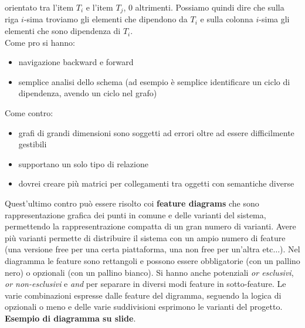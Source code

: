 \documentclass[a4paper,12pt, oneside]{book}
\begin{document}
orientato tra l'item $T_i$ e l'item $T_j$, 0 altrimenti. Possiamo quindi dire
che sulla riga $i$-sima troviamo gli elementi che dipendono da $T_i$ e sulla
colonna $i$-sima gli elementi che sono dipendenza di $T_i$.\\
Come pro si hanno:
\begin{itemize}
  \item navigazione backward e forward
  \item semplice analisi dello schema (ad esempio è semplice identificare un
  ciclo di dipendenza, avendo un ciclo nel grafo)
\end{itemize}
Come contro:
\begin{itemize}
  \item grafi di grandi dimensioni sono soggetti ad errori oltre ad essere
  difficilmente gestibili
  \item supportano un solo tipo di relazione
  \item dovrei creare più matrici per collegamenti tra oggetti con semantiche
  diverse 
\end{itemize}
Quest'ultimo contro può essere risolto coi \textbf{feature diagrams} che sono
rappresentazione grafica dei punti in comune e delle varianti del sistema,
permettendo la rappresentrazione compatta di un gran numero di varianti. Avere
più varianti permette di distribuire il sistema con un ampio numero di feature
(una versione free per una certa piattaforma, una non free per un'altra
etc$\ldots$). Nel diagramma le feature sono rettangoli e possono essere
obbligatorie (con un pallino nero) o opzionali (con un pallino bianco). Si hanno
anche potenziali \textit{or esclusivi}, \textit{or non-esclusivi} e \textit{and}
per separare in diversi modi feature in sotto-feature. Le varie combinazioni
espresse dalle feature del digramma, seguendo la logica di opzionali o meno e
delle varie suddivisioni esprimono le varianti del progetto.
\textbf{Esempio di diagramma su slide}.
\end{document}
